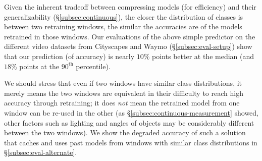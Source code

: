 Given the inherent tradeoff between compressing models (for efficiency) and their generalizability (\S\ref{subsec:continuous}), the closer the distribution of classes is between two retraining windows, the similar the accuracies are of the models retrained in those windows. Our evaluations of the above simple predictor on the different video datasets from Cityscapes and Waymo (\S\ref{subsec:eval-setup}) show that our prediction (of accuracy) is nearly $10\%$ points better at the median (and $18\%$ points at the $90^\text{th}$ percentile).%

We should stress that even if two windows have similar class distributions, it merely means the two windows are equivalent in their difficulty to reach high accuracy through retraining; it does {\em not} mean the retrained model from one window can be re-used in the other (as \S\ref{subsec:continuous-measurement} showed, other factors such as lighting and angles of objects may be considerably different between the two windows). We show the degraded accuracy of such a solution that caches and uses past models from windows with similar class distributions in \S\ref{subsec:eval-alternate}.

